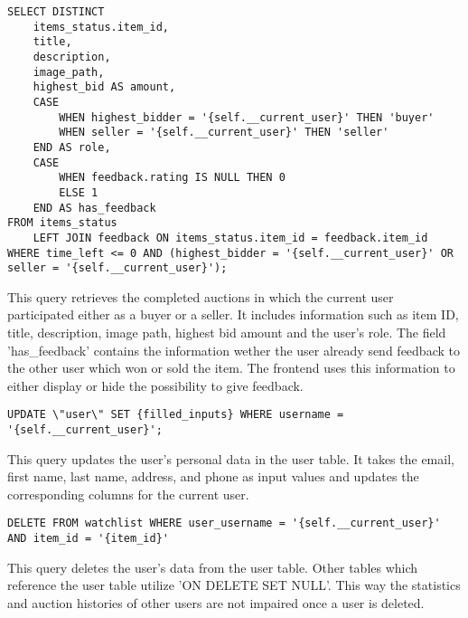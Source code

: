 \begin{lstlisting}[style=sqlStyle]
SELECT DISTINCT
	items_status.item_id, 
	title, 
	description, 
	image_path, 
	highest_bid AS amount, 
	CASE 
		WHEN highest_bidder = '{self.__current_user}' THEN 'buyer'
		WHEN seller = '{self.__current_user}' THEN 'seller'
	END AS role,
	CASE 
		WHEN feedback.rating IS NULL THEN 0
		ELSE 1
	END AS has_feedback
FROM items_status 
	LEFT JOIN feedback ON items_status.item_id = feedback.item_id
WHERE time_left <= 0 AND (highest_bidder = '{self.__current_user}' OR seller = '{self.__current_user}');
\end{lstlisting}
This query retrieves the completed auctions in which the current user participated either as a buyer or a seller. It includes information such as item ID, title, description, image path, highest bid amount and the user's role. The field 'has\_feedback' contains the information wether the user already send feedback to the other user which won or sold the item. The frontend uses this information to either display or hide the possibility to give feedback.

\begin{lstlisting}[style=sqlStyle]
UPDATE \"user\" SET {filled_inputs} WHERE username = '{self.__current_user}';
\end{lstlisting}
This query updates the user's personal data in the user table. It takes the email, first name, last name, address, and phone as input values and updates the corresponding columns for the current user.

\begin{lstlisting}[style=sqlStyle]
DELETE FROM watchlist WHERE user_username = '{self.__current_user}' AND item_id = '{item_id}'
\end{lstlisting}
This query deletes the user's data from the user table. Other tables which reference the user table utilize 'ON DELETE SET NULL'. This way the statistics and auction histories of other users are not impaired once a user is deleted.

